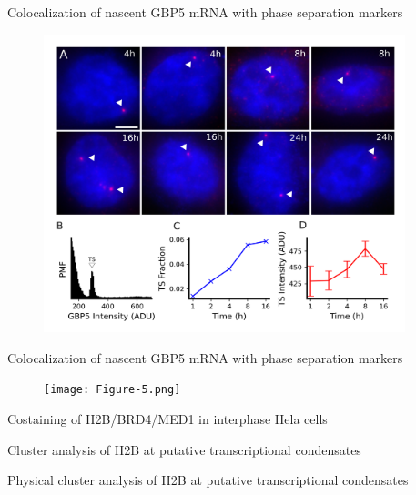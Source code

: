 \documentclass{beamer}					%
\begin{document}
\begin{frame}{Colocalization of nascent GBP5 mRNA with phase separation markers}
\begin{figure}
\includegraphics[width=10.5cm]{Figure-2.png}
\end{figure}
\end{frame}

\begin{frame}{Colocalization of nascent GBP5 mRNA with phase separation markers}
\begin{figure}
\texttt{[image: Figure-5.png]}
\end{figure}
\end{frame}

\begin{frame}{Costaining of H2B/BRD4/MED1 in interphase Hela cells}
\end{frame}

\begin{frame}{Cluster analysis of H2B at putative transcriptional condensates}
\end{frame}

\begin{frame}{Physical cluster analysis of H2B at putative transcriptional condensates}
\end{frame}
\end{document}
